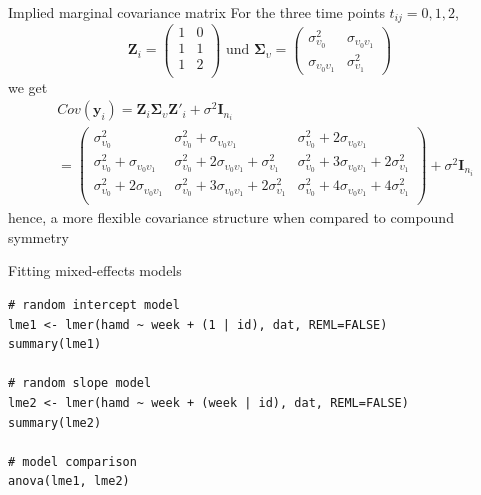 \documentclass[aspectratio=169]{beamer}
\newcommand{\vect}[1]{\mathbf{#1}}
\newcommand{\mat}[1]{\mathbf{#1}}
\newcommand{\gmat}[1]{\boldsymbol{#1}}
\begin{document}
\begin{frame}{Implied marginal covariance matrix}
For the three time points $t_{ij} = 0, 1, 2$,
\[
  \mat{Z}_i =
    \begin{pmatrix}
      1 & 0 \\
      1 & 1 \\
      1 & 2 \\
    \end{pmatrix}
  \text{ und }
  \gmat{\Sigma}_\upsilon =
    \begin{pmatrix}
      \sigma^2_{\upsilon_0} & \sigma_{\upsilon_0 \upsilon_1} \\
      \sigma_{\upsilon_0 \upsilon_1} & \sigma^2_{\upsilon_1}
    \end{pmatrix}
\]
we get
\begin{align*}
  & Cov(\vect{y}_i) =
    \mat{Z}_i \gmat{\Sigma}_\upsilon \mat{Z}'_i + \sigma^2 \mat{I}_{n_i} \\
  &= \begin{pmatrix}
    \sigma^2_{\upsilon_0}                                    & \sigma^2_{\upsilon_0} + \sigma_{\upsilon_0 \upsilon_1}                             & \sigma^2_{\upsilon_0} + 2 \sigma_{\upsilon_0 \upsilon_1} \\
    \sigma^2_{\upsilon_0} + \sigma_{\upsilon_0 \upsilon_1}   & \sigma^2_{\upsilon_0} + 2 \sigma_{\upsilon_0 \upsilon_1} + \sigma^2_{\upsilon_1}   & \sigma^2_{\upsilon_0} + 3 \sigma_{\upsilon_0 \upsilon_1} + 2 \sigma^2_{\upsilon_1} \\
    \sigma^2_{\upsilon_0} + 2 \sigma_{\upsilon_0 \upsilon_1} & \sigma^2_{\upsilon_0} + 3 \sigma_{\upsilon_0 \upsilon_1} + 2 \sigma^2_{\upsilon_1} & \sigma^2_{\upsilon_0} + 4 \sigma_{\upsilon_0 \upsilon_1} + 4 \sigma^2_{\upsilon_1} \\
  \end{pmatrix}
   + \sigma^2 \mat{I}_{n_i}
\end{align*}
hence, a more flexible covariance structure when compared to compound
  symmetry
\end{frame}

\begin{frame}[fragile]{Fitting mixed-effects models}
\begin{lstlisting}
# random intercept model
lme1 <- lmer(hamd ~ week + (1 | id), dat, REML=FALSE)
summary(lme1)

# random slope model
lme2 <- lmer(hamd ~ week + (week | id), dat, REML=FALSE)
summary(lme2)

# model comparison
anova(lme1, lme2)
\end{lstlisting}
\end{frame}
\end{document}
